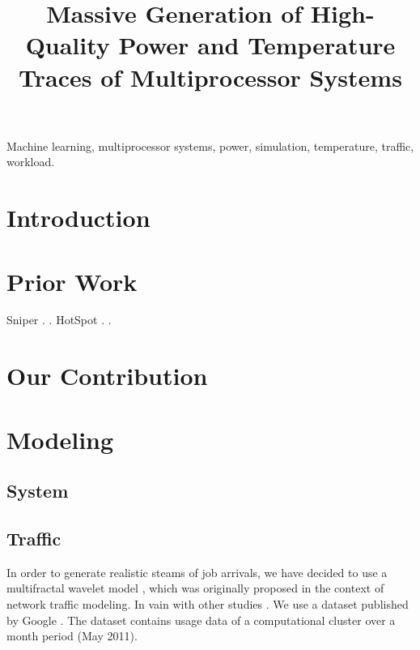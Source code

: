 \documentclass[conference]{IEEEtran}
\title{
  Massive Generation of High-Quality Power and Temperature Traces of
  Multiprocessor Systems
}
\author{}
\begin{document}
  \maketitle

  \begin{abstract}
    
  \end{abstract}

  \begin{IEEEkeywords}
    Machine learning,
    multiprocessor systems,
    power,
    simulation,
    temperature,
    traffic,
    workload.
  \end{IEEEkeywords}


  \section{Introduction} 
  

  \section{Prior Work}
  Sniper \cite{carlson2011}.
   \cite{li2009}.
  HotSpot \cite{skadron2004}.
   \cite{sridhar2010}.

  \section{Our Contribution}

  \section{Modeling}
  \subsection{System}

  \subsection{Traffic}
  In order to generate realistic steams of job arrivals, we have decided to use
  a multifractal wavelet model \cite{riedi1999}, which was originally proposed
  in the context of network traffic modeling. In vain with other studies
  \cite{nikitovic2004}. We use a dataset published by Google \cite{google}. The
  dataset contains usage data of a computational cluster over a month period
  (May 2011).
\end{document}
